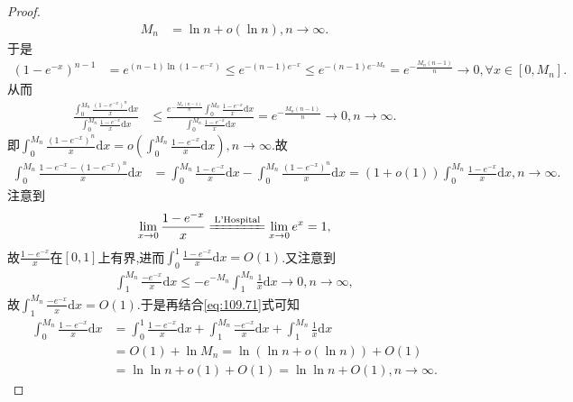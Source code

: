 \documentclass[../../main.tex]{subfiles}
\begin{document}
\begin{proof}
\begin{align}
M_n&=\ln n+o\left( \ln n \right) ,n\rightarrow \infty .\label{eq:109.71}
\end{align}
于是
\begin{align*}
\left( 1-e^{-x} \right) ^{n-1}&=e^{\left( n-1 \right) \ln \left( 1-e^{-x} \right)}\leqslant e^{-\left( n-1 \right) e^{-x}}\leqslant e^{-\left( n-1 \right) e^{-M_n}}=e^{-\frac{M_n\left( n-1 \right)}{n}}\rightarrow 0,\forall x\in \left[ 0,M_n \right] .
\end{align*}
从而
\begin{align*}
\frac{\int_0^{M_n}{\frac{\left( 1-e^{-x} \right) ^n}{x}\mathrm{d}x}}{\int_0^{M_n}{\frac{1-e^{-x}}{x}\mathrm{d}x}}&\leqslant \frac{e^{-\frac{M_n\left( n-1 \right)}{n}}\int_0^{M_n}{\frac{1-e^{-x}}{x}\mathrm{d}x}}{\int_0^{M_n}{\frac{1-e^{-x}}{x}\mathrm{d}x}}=e^{-\frac{M_n\left( n-1 \right)}{n}}\rightarrow 0,n\rightarrow \infty .
\end{align*}
即$\int_0^{M_n}{\frac{\left( 1-e^{-x} \right) ^n}{x}\mathrm{d}x}=o\left( \int_0^{M_n}{\frac{1-e^{-x}}{x}\mathrm{d}x} \right) ,n\rightarrow \infty .$故
\begin{align}
\int_0^{M_n}{\frac{1-e^{-x}-\left( 1-e^{-x} \right) ^n}{x}\mathrm{d}x}&=\int_0^{M_n}{\frac{1-e^{-x}}{x}\mathrm{d}x}-\int_0^{M_n}{\frac{\left( 1-e^{-x} \right) ^n}{x}\mathrm{d}x}=\left( 1+o\left( 1 \right) \right) \int_0^{M_n}{\frac{1-e^{-x}}{x}\mathrm{d}x},n\rightarrow \infty .\label{eq:108.1001}
\end{align}
注意到
\begin{align*}
\lim_{x\rightarrow 0}\frac{1-e^{-x}}{x}\xlongequal{\text{L'Hospital}}\lim_{x\rightarrow 0}e^x=1,
\end{align*}
故$\frac{1-e^{-x}}{x}$在$\left[ 0,1 \right]$上有界,进而$\int_0^1{\frac{1-e^{-x}}{x}\mathrm{d}x}=O(1)$.又注意到
\begin{align*}
\int_1^{M_n}{\frac{-e^{-x}}{x}\mathrm{d}x}\leqslant -e^{-M_n}\int_1^{M_n}{\frac{1}{x}\mathrm{d}x}\rightarrow 0,n\rightarrow \infty ,
\end{align*}
故$\int_1^{M_n}{\frac{-e^{-x}}{x}\mathrm{d}x}=O(1)$.于是再结合\eqref{eq:109.71}式可知
\begin{align*}
\int_0^{M_n}{\frac{1-e^{-x}}{x}\mathrm{d}x}&=\int_0^1{\frac{1-e^{-x}}{x}\mathrm{d}x}+\int_1^{M_n}{\frac{-e^{-x}}{x}\mathrm{d}x}+\int_1^{M_n}{\frac{1}{x}\mathrm{d}x} \\
&=O\left( 1 \right) +\ln M_n=\ln \left( \ln n+o\left( \ln n \right) \right) +O\left( 1 \right) \\
&=\ln\ln n+o\left( 1 \right) +O\left( 1 \right) =\ln\ln n+O\left( 1 \right) ,n\rightarrow \infty .

\end{align*}
\end{proof}
\end{document}
